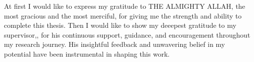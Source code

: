 \newpage
{}

At first I would like to express my gratitude to THE ALMIGHTY ALLAH, the most gracious and the most merciful, for giving me the strength and ability to complete this thesis. Then I would like to show my deeepest gratitude to my supervisor,\thesupervisor, for his continuous support, guidance, and encouragement throughout my research journey. His insightful feedback and unwavering belief in my potential have been instrumental in shaping this work.